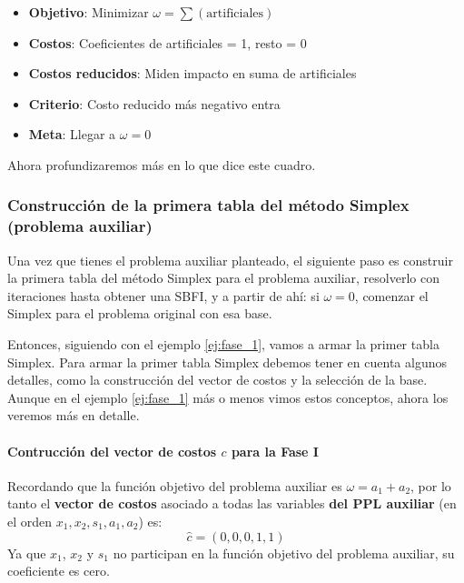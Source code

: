 \begin{tcolorbox}[interesting_data, title=Siempre recordar lo que se busca en la Fase I]
  \begin{itemize}
    \item \textbf{Objetivo}: Minimizar \(\omega = \sum(\text{artificiales})\)
    \item \textbf{Costos}: Coeficientes de artificiales = 1, resto = 0
    \item \textbf{Costos reducidos}: Miden impacto en suma de artificiales
    \item \textbf{Criterio}: Costo reducido más negativo entra
    \item \textbf{Meta}: Llegar a \(\omega = 0\)
  \end{itemize}
\end{tcolorbox}
Ahora profundizaremos más en lo que dice este cuadro. 

\subsubsection{Construcción de la primera tabla del método Simplex (problema auxiliar)}

Una vez que tienes el problema auxiliar planteado, el siguiente paso es construir la primera tabla del método Simplex para el problema auxiliar, resolverlo con iteraciones hasta obtener una SBFI, y a partir de ahí: si \(\omega = 0\), comenzar el Simplex para el problema original con esa base.

Entonces, siguiendo con el ejemplo \ref{ej:fase_1}, vamos a armar la primer tabla Simplex. Para armar la primer tabla Simplex debemos tener en cuenta algunos detalles, como la construcción del vector de costos y la selección de la base. Aunque en el ejemplo \ref{ej:fase_1} más o menos vimos estos conceptos, ahora los veremos más en detalle.

\paragraph{Contrucción del vector de costos \(c\) para la Fase I}

Recordando que la función objetivo del problema auxiliar es \(\omega = a_1 + a_2\), por lo tanto el \textbf{vector de costos} asociado a todas las variables \textbf{del PPL auxiliar} (en el orden \(x_1, x_2, s_1, a_1, a_2\)) es: 
\[
  \hat{c} = (0, 0, 0, 1, 1)
\]
Ya que \(x_1\), \(x_2\) y \(s_1\) no participan en la función objetivo del problema auxiliar, su coeficiente es cero.

